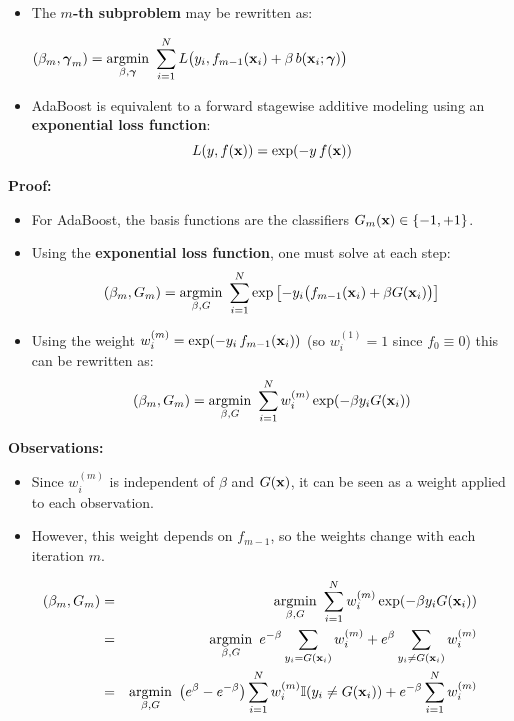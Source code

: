   \begin{itemize}
    \item The \textbf {$m$-th subproblem} may be rewritten as:              
      \begin{center}
            $
              \displaystyle
              (\beta_m, \bm{\mathrm{\gamma}}_m) = \operatorname*{argmin}_{\beta, \bm{\mathrm{\gamma}}} ~\sum_{i=1}^N L\big(y_i, f_{m-1}(\bm{\mathrm{x}}_i) + \beta \, b(\bm{\mathrm{x}}_i ; \bm{\mathrm{\gamma}})\big)
            $
      \end{center}
    \item AdaBoost is equivalent to a forward stagewise additive modeling using an \textbf {exponential loss function}:
      \begin{displaymath}
        L(y, f(\bm{\mathrm{x}})) = \exp (-y \, f(\bm{\mathrm{x}}))
      \end{displaymath}
  \end{itemize}
  \textbf {Proof:}

  \begin{itemize}
    \item For AdaBoost, the basis functions are the classifiers $G_m(\bm{\mathrm{x}}) \in \{-1,+1\}$.
    \item Using the \textbf{exponential loss function}, one must solve at each step:
      \begin{eqnarray*}
        (\beta_m, G_m) = \operatorname*{argmin}_{\beta, G} ~\sum_{i=1}^N \exp \left[ -y_i \big(f_{m-1}(\bm{\mathrm{x}}_i) + \beta G(\bm{\mathrm{x}}_i)\big) \right]
      \end{eqnarray*}
    \item Using the weight $w_i^{(m)} = \exp(-y_i \, f_{m-1}(\bm{\mathrm{x}}_i))$ (so $w_i^{(1)}=1$ since $f_0\equiv0$) this can be rewritten as:
      \begin{eqnarray*}
        (\beta_m, G_m) = \operatorname*{argmin}_{\beta, G} ~\sum_{i=1}^N w_i^{(m)} \exp (-\beta y_i G(\bm{\mathrm{x}}_i))
      \end{eqnarray*}
  \end{itemize}

 \textbf {Observations:}
  \begin{itemize}
    \item Since $w_i^{(m)}$ is independent of $\beta$ and $G(\bm{\mathrm{x}})$, it can be seen as a weight applied to each observation.
    \item However, this weight depends on $f_{m-1}$, so the weights change with each iteration $m$.
  \end{itemize}

  \begin{eqnarray*}
    (\beta_m, G_m) 
      &=& \operatorname*{argmin}_{\beta, G} ~\sum_{i=1}^N w_i^{(m)} \exp (-\beta y_i G(\bm{\mathrm{x}}_i)) \\ 
      &=& \operatorname*{argmin}_{\beta, G} ~ e^{-\beta} \sum_{y_i = G(\bm{\mathrm{x}}_i)} w_i^{(m)} + e^{\beta} \sum_{y_i \neq G(\bm{\mathrm{x}}_i)} w_i^{(m)} \\ 
      &=& \operatorname*{argmin}_{\beta, G} ~ \left( e^{\beta} - e^{-\beta} \right) \sum_{i=1}^N w_i^{(m)} \mathbb I(y_i \neq G(\bm{\mathrm{x}}_i)) + e^{-\beta} \sum_{i=1}^N w_i^{(m)}
  \end{eqnarray*}

